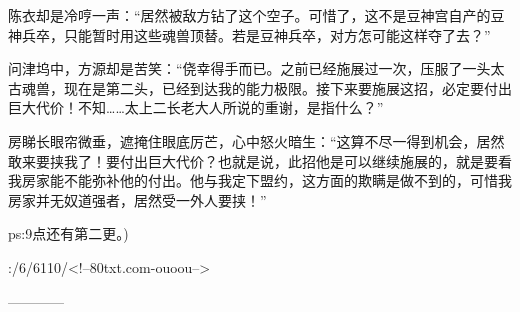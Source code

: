 \begin{this_body}
陈衣却是冷哼一声：“居然被敌方钻了这个空子。可惜了，这不是豆神宫自产的豆神兵卒，只能暂时用这些魂兽顶替。若是豆神兵卒，对方怎可能这样夺了去？”

问津坞中，方源却是苦笑：“侥幸得手而已。之前已经施展过一次，压服了一头太古魂兽，现在是第二头，已经到达我的能力极限。接下来要施展这招，必定要付出巨大代价！不知……太上二长老大人所说的重谢，是指什么？”

房睇长眼帘微垂，遮掩住眼底厉芒，心中怒火暗生：“这算不尽一得到机会，居然敢来要挟我了！要付出巨大代价？也就是说，此招他是可以继续施展的，就是要看我房家能不能弥补他的付出。他与我定下盟约，这方面的欺瞒是做不到的，可惜我房家并无奴道强者，居然受一外人要挟！”

ps:9点还有第二更。)

:/6/6110/<!--80txt.com-ouoou-->

------------

\end{this_body}

